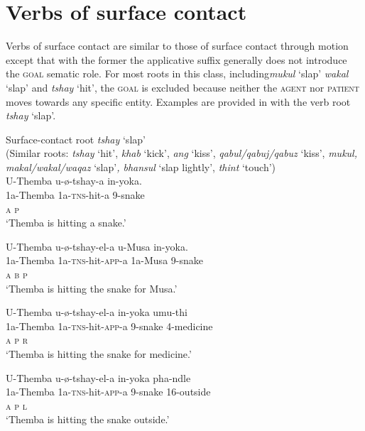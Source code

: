 \documentclass[output=paper]{langsci/langscibook}
\begin{document}
\section{Verbs of surface contact}

Verbs of surface contact are similar to those of surface contact through motion except that with the former the applicative suffix generally does not introduce the \textsc{goal} sematic role. For most roots in this class, including\textit {mukul} ‘slap’ \textit{wakal} ‘slap’ and \textit{tshay} ‘hit’, the \textsc{goal} is excluded because neither the \textsc{agent} nor \textsc{patient} moves towards any specific entity. Examples are provided in  with the verb root \textit{tshay} ‘slap’.

\ea
{Surface-contact root \textit {tshay }‘slap’ }\\
 (Similar roots: \textit{tshay} ‘hit’, \textit{khab} ‘kick’, \textit{ang} ‘kiss’, \textit{qabul/qabuj/qabuz} ‘kiss’, \textit{mukul, makal/wakal/waqaz }‘slap’\textit{, bhansul} ‘slap lightly’, \textit{thint} ‘touch’)\\
\ea
\gll U-Themba u-ø-tshay-a in-yoka. \\
 1a-Themba 1a-\textsc{tns}-hit-a 9-snake\\
 \textsc{a p}\\
\glt ‘Themba is hitting a snake.’

\ex
\gll U-Themba u-ø-tshay-el-a u-Musa in-yoka. \\
 1a-Themba 1a-\textsc{tns}-hit-\textsc{app}-a 1a-Musa 9-snake\\
 \textsc{a b p}\\
\glt ‘Themba is hitting the snake for Musa.’ 

\ex
\gll U-Themba u-ø-tshay-el-a in-yoka umu-thi\\
 1a-Themba 1a-\textsc{tns}-hit-\textsc{app}-a 9-snake 4-medicine\\
 \textsc{a p r}\\
\glt ‘Themba is hitting the snake for medicine.’ 

\ex
\gll U-Themba u-ø-tshay-el-a in-yoka pha-ndle \\
 1a-Themba 1a-\textsc{tns}-hit-\textsc{app}-a 9-snake 16-outside\\
 \textsc{a p l}\\
\glt ‘Themba is hitting the snake outside.’ 
\z
\z
\end{document}
